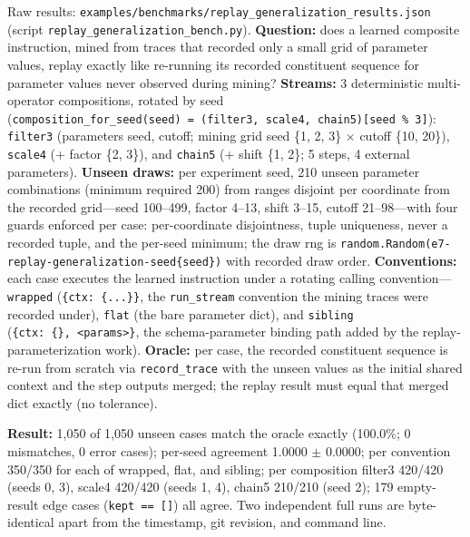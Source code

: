\documentclass[
  11pt,
]{article}
\begin{document}
Raw results:
\texttt{examples/benchmarks/replay\_generalization\_results.json}
(script \texttt{replay\_generalization\_bench.py}). \textbf{Question:}
does a learned composite instruction, mined from traces that recorded
only a small grid of parameter values, replay exactly like re-running
its recorded constituent sequence for parameter values never observed
during mining? \textbf{Streams:} 3 deterministic multi-operator
compositions, rotated by seed
(\texttt{composition\_for\_seed(seed)\ =\ (\textquotesingle{}filter3\textquotesingle{},\ \textquotesingle{}scale4\textquotesingle{},\ \textquotesingle{}chain5\textquotesingle{}){[}seed\ \%\ 3{]}}):
\texttt{filter3} (parameters seed, cutoff; mining grid seed \{1, 2, 3\}
\(\times\) cutoff \{10, 20\}), \texttt{scale4} (+ factor \{2, 3\}), and
\texttt{chain5} (+ shift \{1, 2\}; 5 steps, 4 external parameters).
\textbf{Unseen draws:} per experiment seed, 210 unseen parameter
combinations (minimum required 200) from ranges disjoint per coordinate
from the recorded grid---seed 100--499, factor 4--13, shift 3--15,
cutoff 21--98---with four guards enforced per case: per-coordinate
disjointness, tuple uniqueness, never a recorded tuple, and the per-seed
minimum; the draw rng is
\texttt{random.Random(\textquotesingle{}e7-replay-generalization-seed\{seed\}\textquotesingle{})}
with recorded draw order. \textbf{Conventions:} each case executes the
learned instruction under a rotating calling
convention---\texttt{wrapped}
(\texttt{\{\textquotesingle{}ctx\textquotesingle{}:\ \{...\}\}}, the
\texttt{run\_stream} convention the mining traces were recorded under),
\texttt{flat} (the bare parameter dict), and \texttt{sibling}
(\texttt{\{\textquotesingle{}ctx\textquotesingle{}:\ \{\},\ \textless{}params\textgreater{}\}},
the schema-parameter binding path added by the replay-parameterization
work). \textbf{Oracle:} per case, the recorded constituent sequence is
re-run from scratch via \texttt{record\_trace} with the unseen values as
the initial shared context and the step outputs merged; the replay
result must equal that merged dict exactly (no tolerance).

\textbf{Result:} 1,050 of 1,050 unseen cases match the oracle exactly
(100.0\%; 0 mismatches, 0 error cases); per-seed agreement 1.0000
\(\pm\) 0.0000; per convention 350/350 for each of wrapped, flat, and
sibling; per composition filter3 420/420 (seeds 0, 3), scale4 420/420
(seeds 1, 4), chain5 210/210 (seed 2); 179 empty-result edge cases
(\texttt{kept\ ==\ {[}{]}}) all agree. Two independent full runs are
byte-identical apart from the timestamp, git revision, and command line.
\end{document}
